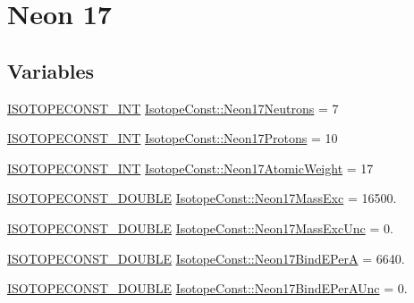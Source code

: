 \hypertarget{group___isotope_const-_neon-_ne17}{}\section{Neon 17}
\label{group___isotope_const-_neon-_ne17}
\subsection*{Variables}
\begin{DoxyCompactItemize}
\item 
\mbox{\hyperlink{group___isotope_const-_macros_ga5f18360b3e99483a35c32d789e62621c}{I\+S\+O\+T\+O\+P\+E\+C\+O\+N\+S\+T\+\_\+\+I\+NT}} \mbox{\hyperlink{group___isotope_const-_neon-_ne17_ga7a40b2acabda78b61cf6494d6c07664d}{Isotope\+Const\+::\+Neon17\+Neutrons}} = 7
\item 
\mbox{\hyperlink{group___isotope_const-_macros_ga5f18360b3e99483a35c32d789e62621c}{I\+S\+O\+T\+O\+P\+E\+C\+O\+N\+S\+T\+\_\+\+I\+NT}} \mbox{\hyperlink{group___isotope_const-_neon-_ne17_gaf0ab244dd446fef94c24f959dca7a4ea}{Isotope\+Const\+::\+Neon17\+Protons}} = 10
\item 
\mbox{\hyperlink{group___isotope_const-_macros_ga5f18360b3e99483a35c32d789e62621c}{I\+S\+O\+T\+O\+P\+E\+C\+O\+N\+S\+T\+\_\+\+I\+NT}} \mbox{\hyperlink{group___isotope_const-_neon-_ne17_ga96610086b122f2487217b7e44ae60d33}{Isotope\+Const\+::\+Neon17\+Atomic\+Weight}} = 17
\item 
\mbox{\hyperlink{group___isotope_const-_macros_ga8f45a7272ce02c0b4c65c44636ed719a}{I\+S\+O\+T\+O\+P\+E\+C\+O\+N\+S\+T\+\_\+\+D\+O\+U\+B\+LE}} \mbox{\hyperlink{group___isotope_const-_neon-_ne17_ga3c92436846e7e331b370dc4b63b84870}{Isotope\+Const\+::\+Neon17\+Mass\+Exc}} = 16500.
\item 
\mbox{\hyperlink{group___isotope_const-_macros_ga8f45a7272ce02c0b4c65c44636ed719a}{I\+S\+O\+T\+O\+P\+E\+C\+O\+N\+S\+T\+\_\+\+D\+O\+U\+B\+LE}} \mbox{\hyperlink{group___isotope_const-_neon-_ne17_gaea971274962b3f98c1feb75551c5f6ce}{Isotope\+Const\+::\+Neon17\+Mass\+Exc\+Unc}} = 0.
\item 
\mbox{\hyperlink{group___isotope_const-_macros_ga8f45a7272ce02c0b4c65c44636ed719a}{I\+S\+O\+T\+O\+P\+E\+C\+O\+N\+S\+T\+\_\+\+D\+O\+U\+B\+LE}} \mbox{\hyperlink{group___isotope_const-_neon-_ne17_ga216ae76663f29884c6eb011e522f585c}{Isotope\+Const\+::\+Neon17\+Bind\+E\+PerA}} = 6640.
\item 
\mbox{\hyperlink{group___isotope_const-_macros_ga8f45a7272ce02c0b4c65c44636ed719a}{I\+S\+O\+T\+O\+P\+E\+C\+O\+N\+S\+T\+\_\+\+D\+O\+U\+B\+LE}} \mbox{\hyperlink{group___isotope_const-_neon-_ne17_gaad94dbc38f2145e2badf2f65f7ef7fd6}{Isotope\+Const\+::\+Neon17\+Bind\+E\+Per\+A\+Unc}} = 0.

\end{DoxyCompactItemize}
